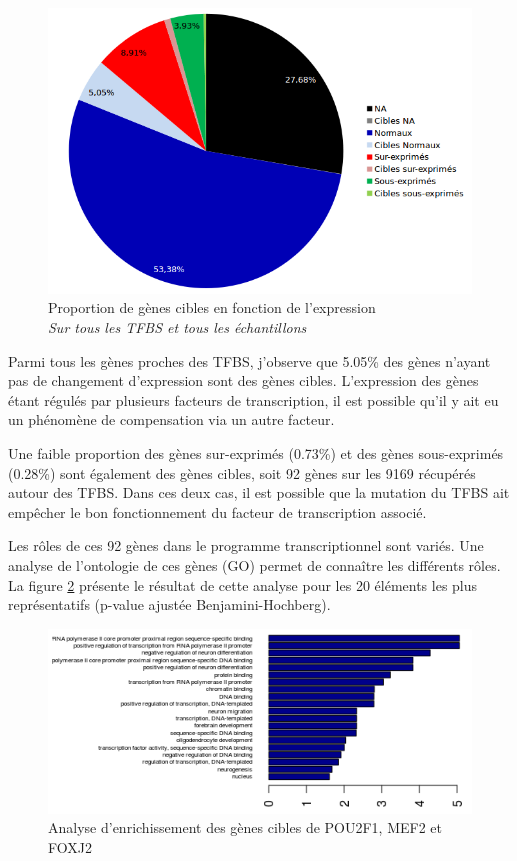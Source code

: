 \begin{figure}[h]
\centering
\includegraphics[scale=0.7]{Figures/Cible_expression.png}
\captionsetup{justification=centering}
\caption{Proportion de gènes cibles en fonction de l'expression\\
\textit{Sur tous les TFBS et tous les échantillons}}
\label{fig:pou}
\end{figure}

Parmi tous les gènes proches des TFBS, j'observe que 5.05\% des gènes n'ayant pas de changement d'expression sont des gènes cibles. L'expression des gènes étant régulés par plusieurs facteurs de transcription, il est possible qu'il y ait eu un phénomène de compensation via un autre facteur.

Une faible proportion des gènes sur-exprimés (0.73\%) et des gènes sous-exprimés (0.28\%) sont également des gènes cibles, soit 92 gènes sur les 9169 récupérés autour des TFBS. Dans ces deux cas, il est possible que la mutation du TFBS ait empêcher le bon fonctionnement du facteur de transcription associé.

Les rôles de ces 92 gènes dans le programme transcriptionnel sont variés. Une analyse de l'ontologie de ces gènes (GO) permet de connaître les différents rôles. La figure \ref{fig:go} présente le résultat de cette analyse pour les 20 éléments les plus représentatifs (p-value ajustée Benjamini-Hochberg).

\begin{figure}[h]
\centering
\includegraphics[scale=1]{Figures/GO.png}
\captionsetup{justification=centering}
\caption{Analyse d'enrichissement des gènes cibles de POU2F1, MEF2 et FOXJ2}
\label{fig:go}
\end{figure}


